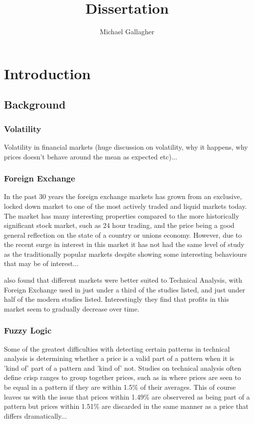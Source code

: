 \documentclass{article}
\title{Dissertation}
\author{Michael Gallagher}
\begin{document}
\maketitle

\tableofcontents

\section{Introduction}

\subsection{Background}

\subsubsection{Volatility}

Volatility in financial markets (huge discussion on volatility, why it happens, why prices doesn't behave around the mean as expected etc)...	

\subsubsection{Foreign Exchange}

In the past 30 years the foreign exchange markets has grown from an exclusive, locked down market to one of the most actively traded and liquid markets today. The market has many interesting properties compared to the more historically significant stock market, such as 24 hour trading, and the price being a good general reflection on the state of a country or unions economy. However, due to the recent surge in interest in this market it has not had the same level of study as the traditionally popular markets despite showing some interesting behaviours that may be of interest...

\cite{taprofitability} also found that different markets were better suited to Technical Analysis, with Foreign Exchange used in just under a third of the studies listed, and just under half of the modern studies listed. Interestingly they find that profits in this market seem to gradually decrease over time.

\subsubsection{Fuzzy Logic}

Some of the greatest difficulties with detecting certain patterns in technical analysis is determining whether a price is a valid part of a pattern when it is 'kind of' part of a pattern and 'kind of' not. Studies on technical analysis often define crisp ranges to group together prices, such as in \citep{foundations} where prices are seen to be equal in a pattern if they are within 1.5\% of their averages. This of course leaves us with the issue that prices within 1.49\% are observered as being part of a pattern but prices within 1.51\% are discarded in the same manner as a price that differs dramatically...
\end{document}
